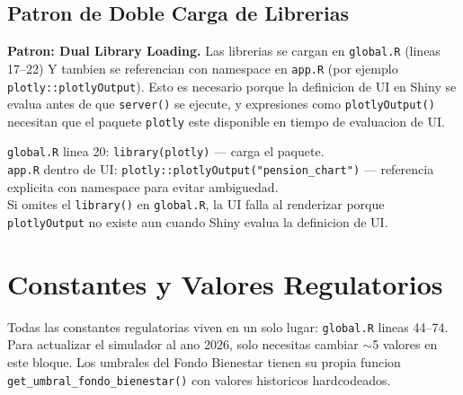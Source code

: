 \documentclass[11pt, letterpaper, twoside]{report}
\begin{document}
\subsection{Patron de Doble Carga de Librerias}
\label{sec:doblecarga}

\begin{patronbox}
\textbf{Patron: Dual Library Loading.} Las librerias se cargan en \texttt{global.R}
(lineas 17--22) Y tambien se referencian con namespace en \texttt{app.R}
(por ejemplo \texttt{plotly::plotlyOutput}). Esto es necesario porque la definicion
de UI en Shiny se evalua antes de que \texttt{server()} se ejecute, y expresiones
como \texttt{plotlyOutput()} necesitan que el paquete \texttt{plotly} este disponible
en tiempo de evaluacion de UI.
\end{patronbox}

\begin{codigobox}
\texttt{global.R} linea 20: \texttt{library(plotly)} --- carga el paquete.\\
\texttt{app.R} dentro de UI: \texttt{plotly::plotlyOutput("pension\_chart")} --- referencia
explicita con namespace para evitar ambiguedad.\\
Si omites el \texttt{library()} en \texttt{global.R}, la UI falla al renderizar porque
\texttt{plotlyOutput} no existe aun cuando Shiny evalua la definicion de UI.
\end{codigobox}


\section{Constantes y Valores Regulatorios}
\label{sec:constantes}

\begin{intuicionbox}
Todas las constantes regulatorias viven en un solo lugar: \texttt{global.R} lineas
44--74. Para actualizar el simulador al ano 2026, solo necesitas cambiar $\sim$5
valores en este bloque. Los umbrales del Fondo Bienestar tienen su propia funcion
\texttt{get\_umbral\_fondo\_bienestar()} con valores historicos hardcodeados.
\end{intuicionbox}
\end{document}
